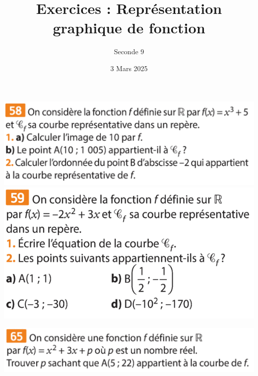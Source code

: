 \documentclass{article}
\title{Exercices : Représentation graphique de fonction}
\author{Seconde 9}
\date{3 Mars 2025}
\begin{document}
\maketitle
\begin{minipage}{0.45\textwidth}
    
    \includegraphics[width=\textwidth]{Exercice_1.png}
    \includegraphics[width=\textwidth]{Exercice_2.png}
\end{minipage}
\hfill\vline\hfill
\begin{minipage}{0.45\textwidth}
\includegraphics[width=\textwidth]{Exercice_3.png}
\end{minipage}

\vspace*{1cm}
\end{document}
